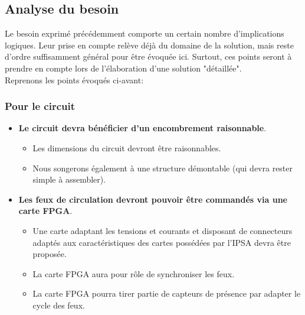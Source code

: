 \subsection{Analyse du besoin}

Le besoin exprimé précédemment comporte un certain nombre d'implications logiques.
Leur prise en compte relève déjà du domaine de la solution, mais reste d'ordre suffisamment général pour être évoquée ici. Surtout, ces points seront à prendre en compte lors de l'élaboration d'une solution "détaillée".\\

Reprenons les points évoqués ci-avant:

\renewcommand{\labelitemi}{\textbullet}
\renewcommand{\labelitemii}{$\Rightarrow$}
\renewcommand{\labelitemiii}{-}
\renewcommand{\labelitemiv}{\textbullet}

	\subsubsection{Pour le circuit}
		\begin{itemize}
			\item \textbf{Le circuit devra bénéficier d'un encombrement raisonnable}.
			\begin{itemize}
				\item Les dimensions du circuit devront être raisonnables.
				\item Nous songerons également à une structure démontable (qui devra rester simple à assembler).
			\end{itemize}
			\item \textbf{Les feux de circulation devront pouvoir être commandés via une carte FPGA}.
			\begin{itemize}
				\item Une carte adaptant les tensions et courants et disposant de connecteurs adaptés aux caractéristiques des cartes possédées par l'IPSA devra être proposée.
				\item La carte FPGA aura pour rôle de synchroniser les feux.
				\item La carte FPGA pourra tirer partie de capteurs de présence par adapter le cycle des feux.
			\end{itemize}
		\end{itemize}
